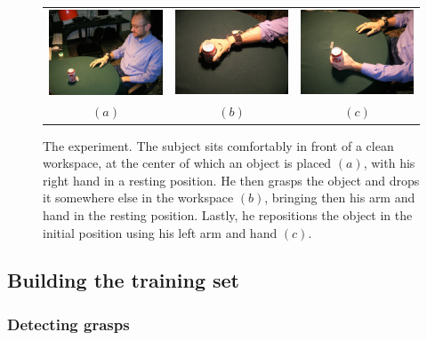 \begin{figure}[htbp]
  \begin{center}
    \begin{tabular}{ccc}
      \includegraphics[width=0.3\linewidth]{exp1.eps} &
      \includegraphics[width=0.3\linewidth]{exp2.eps}  &
      \includegraphics[width=0.3\linewidth]{exp3.eps} \\
      $(a)$ & $(b)$ & $(c)$
    \end{tabular}
    \caption{The experiment. The subject sits comfortably in front of
    a clean workspace, at the center of which an object is placed
    $(a)$, with his right hand in a resting position. He then grasps
    the object and drops it somewhere else in the workspace $(b)$,
    bringing then his arm and hand in the resting position. Lastly, he
    repositions the object in the initial position using his left arm
    and hand $(c)$.}
    \label{fig:setup}
  \end{center}
\end{figure}

\subsection{Building the training set}

\subsubsection*{Detecting grasps}

